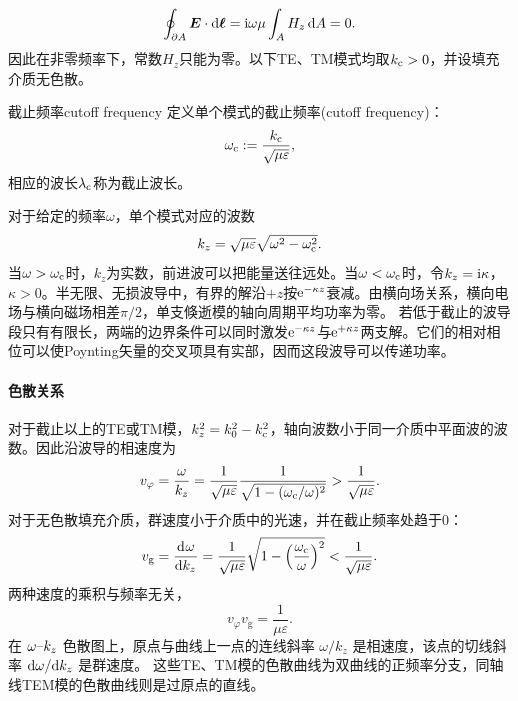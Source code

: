 \[
    \oint_{\p A}\bm E \cdot \d\bm\ell = \i\omega\mu\int_A H_z\d A = 0.
\]
因此在非零频率下，常数$H_z$只能为零。以下TE、TM模式均取$k_\cutoff > 0$，并设填充介质无色散。
\begin{definition}
    {截止频率}{cutoff frequency}
    定义单个模式的截止频率(cutoff frequency)：
    \begin{equation}
        \label{eqn:cutoff omega}
        \omega_\cutoff := \frac{k_\cutoff}{\sqrt{\mu\varepsilon}},
    \end{equation}
    相应的波长$\lambda_\cutoff$称为截止波长。
\end{definition}
对于给定的频率$\omega$，单个模式对应的波数
\begin{equation}
    k_z = \sqrt{\mu\varepsilon}\sqrt{\omega^2 - \omega_\cutoff^2}.
\end{equation}
当$\omega > \omega_\cutoff$时，$k_z$为实数，前进波可以把能量送往远处。当$\omega < \omega_\cutoff$时，令$k_z = \i\kappa$，$\kappa > 0$。半无限、无损波导中，有界的解沿$+z$按$\e^{-\kappa z}$衰减。由横向场关系，横向电场与横向磁场相差$\pi/2$，单支倏逝模的轴向周期平均功率为零。
若低于截止的波导段只有有限长，两端的边界条件可以同时激发$\e^{-\kappa z}$与$\e^{+\kappa z}$两支解。它们的相对相位可以使Poynting矢量的交叉项具有实部，因而这段波导可以传递功率。

\paragraph{色散关系}

对于截止以上的TE或TM模，$k_z^2 = k_0^2 - k_\cutoff^2$，轴向波数小于同一介质中平面波的波数。因此沿波导的相速度为
\begin{equation}
    \label{eq:ed-waveguide-phase-velocity}
    v_\varphi = \frac\omega{k_z} = \frac1{\sqrt{\mu\varepsilon}}\frac1{\sqrt{1 - (\omega_\cutoff/\omega)^2}} > \frac1{\sqrt{\mu\varepsilon}}.
\end{equation}
对于无色散填充介质，群速度小于介质中的光速，并在截止频率处趋于0：
\begin{equation}
    \label{eq:ed-waveguide-group-velocity}
    v_{\mathrm{g}} = \dv\omega{k_z} = \frac1{\sqrt{\mu\varepsilon}}\sqrt{1 - \Bigp{\frac{\omega_\cutoff}\omega}^2} < \frac1{\sqrt{\mu\varepsilon}}.
\end{equation}
两种速度的乘积与频率无关，
\begin{equation}
    v_\varphi v_{\mathrm{g}} = \frac1{\mu\varepsilon}.
\end{equation}
在 $\omega\vs k_z$ 色散图上，原点与曲线上一点的连线斜率 $\omega/k_z$ 是相速度，该点的切线斜率 $\d\omega/\nd k_z$ 是群速度。
这些TE、TM模的色散曲线为双曲线的正频率分支，同轴线TEM模的色散曲线则是过原点的直线。

